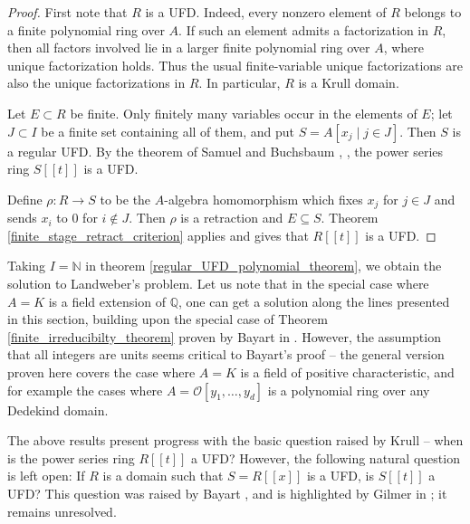 \documentclass{article}
\newcommand{\Q}{\mathbb{Q}}
\theoremstyle{plain}
\theoremstyle{definition}
\theoremstyle{remark}
\theoremstyle{plain}
\begin{document}
\begin{proof}
First note that $R$ is a UFD. Indeed, every nonzero element of $R$ belongs to a finite polynomial ring over $A$. If such an element admits a factorization in $R$, then all factors involved lie in a larger finite polynomial ring over $A$, where unique factorization holds. Thus the usual finite-variable unique factorizations are also the unique factorizations in $R$. In particular, $R$ is a Krull domain.

Let $E\subset R$ be finite. Only finitely many variables occur in the elements of $E$; let $J\subset I$ be a finite set containing all of them, and put $S=A[x_j\mid j\in J]$. Then $S$ is a regular UFD. By the theorem of Samuel and Buchsbaum \cite[Theorem 2.1]{Samuel61}, \cite[Theorem 3.2]{Buchsbaum61}, the power series ring $S[[t]]$ is a UFD.

Define $\rho:R\to S$ to be the $A$-algebra homomorphism which fixes $x_j$ for $j\in J$ and sends $x_i$ to $0$ for $i\notin J$. Then $\rho$ is a retraction and $E\subseteq S$. Theorem \ref{finite_stage_retract_criterion} applies and gives that $R[[t]]$ is a UFD.
\end{proof}

Taking $I=\mathbb N$ in theorem \ref{regular_UFD_polynomial_theorem}, we obtain the solution to Landweber's problem. Let us note that in the special case where $A = K$ is a field extension of $\Q$, one can get a solution along the lines presented in this section, building upon the special case of Theorem \ref{finite_irreducibilty_theorem} proven by Bayart in \cite[\S IV]{Bayart81}. However, the assumption that all integers are units seems critical to Bayart's proof -- the general version proven here covers the case where $A = K$ is a field of positive characteristic, and for example the cases where $A = \mathcal{O}[y_1,\ldots,y_d]$ is a polynomial ring over any Dedekind domain.

The above results present progress with the basic question raised by Krull -- when is the power series ring $R[[t]]$ a UFD? However, the following natural question is left open: If $R$ is a domain such that $S = R[[x]]$ is a UFD, is $S[[t]]$ a UFD? This question was raised by Bayart \cite{Bayart73}, and is highlighted by Gilmer in \cite{Gilmer06Questions}; it remains unresolved.
\end{document}
